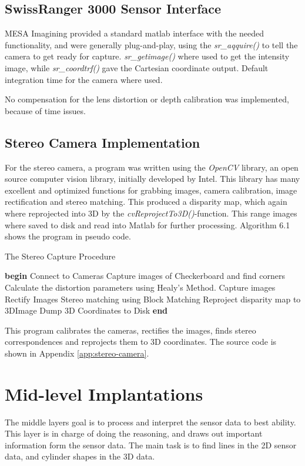 \subsection{SwissRanger 3000 Sensor Interface}
MESA Imagining provided a standard matlab interface with the needed functionality, and
were generally plug-and-play, using the \emph{sr\_aqquire()} to tell the camera to get
ready for capture. \emph{sr\_getimage()} where used to get the intensity image, while
\emph{sr\_coordtrf()} gave the Cartesian coordinate output. Default integration time for
the camera where used. 

No compensation for the lens distortion or depth calibration was implemented, because of
time issues. 

\subsection{Stereo Camera Implementation}
For the stereo camera, a program was written using the \emph{OpenCV} library, an open
source computer vision library, initially developed by Intel. This library has many
excellent and optimized functions for grabbing images, camera calibration, image rectification
and stereo matching. This produced a disparity map, which again where reprojected into 3D
by the \emph{cvReprojectTo3D()}-function. This range images where saved to disk and
read into Matlab for further processing. Algorithm 6.1 shows the program in pseudo code.

\begin{algorithm}
\caption{The Stereo Capture Procedure}
\label{chap6:alg-stereomatch}
    \begin{algorithmic}
    \STATE \textbf{begin}
    \STATE Connect to Cameras
        \STATE Capture images of Checkerboard and find corners
    \ENDFOR
    \STATE Calculate the distortion parameters using Healy's Method.
        \STATE Capture images
        \STATE Rectify Images
        \STATE Stereo matching using Block Matching 
        \STATE Reproject disparity map to 3DImage
        \STATE Dump 3D Coordinates to Disk
    \ENDWHILE
    \STATE \textbf{end}
    \end{algorithmic}
\end{algorithm}
This program calibrates the cameras, rectifies the images, finds stereo correspondences
and reprojects them to 3D coordinates. The source code is shown in Appendix
\ref{app:stereo-camera}.


\section{Mid-level Implantations}
The middle layers goal is to process and interpret the sensor data to best ability. This
layer is in charge of doing the reasoning, and draws out important information form the
sensor data. The main task is to find lines in the 2D sensor data, and cylinder shapes in
the 3D data. 


